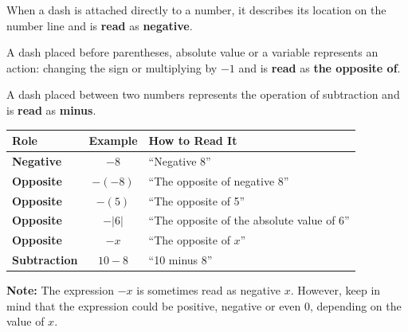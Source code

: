 \documentclass{ximera}[font=12pt]
\begin{document}
\begin{description}[style=nextline, leftmargin=0pt]  %
    \item[Negative] When a dash is attached directly to a number, it describes its location on the number line and
    is \textbf{read} as \textbf{negative}.

    \item[Opposite]  A dash placed before parentheses, absolute value or a variable represents an action: changing the sign or multiplying by $-1$ and is \textbf{read} as \textbf{the opposite of}.

    \item[Subtraction]  A dash placed between two numbers represents the operation of subtraction
    and is \textbf{read} as \textbf{minus}.

\begin{center}
\renewcommand{\arraystretch}{1.5} %
\begin{tabular}{|l|c|l|}
\hline
\rowcolor{glaucous!30} %
\large \textbf{Role} & \large \textbf{Example} & \large \textbf{How to Read It} \\
\hline
\textbf{Negative} & $-8$ & ``Negative 8'' \\
\hline
\textbf{Opposite} & $-(-8)$ & ``The opposite of negative 8'' \\
\hline
\textbf{Opposite} & $-(5)$ & ``The opposite of 5'' \\
\hline
\textbf{Opposite} & $-|6|$ & ``The opposite of the absolute value of $6$'' \\
\hline
\textbf{Opposite} & $-x$ & ``The opposite of $x$'' \\
\hline
\textbf{Subtraction} & $10 - 8$ & ``10 minus 8'' \\
\hline
\end{tabular}
\end{center}


\textbf{Note:} The expression $-x$ is sometimes read as negative $x.$  However, keep in mind that the expression
could be positive, negative or even 0, depending on the value of $x.$

\end{description}
\end{document}
